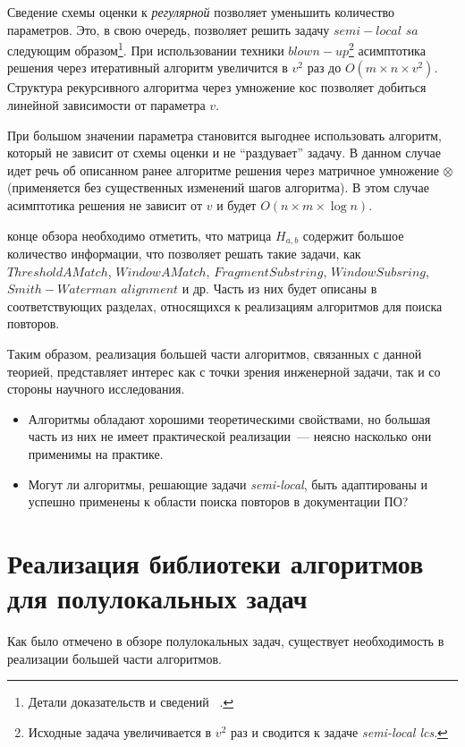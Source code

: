 Сведение схемы оценки к \emph{регулярной} позволяет уменьшить количество параметров.
Это, в свою очередь, позволяет решить задачу $semi-local$ $sa$ следующим образом\footnote{Детали доказательств и сведений ~\cite{tiskin2006all}.}. 
При использовании техники $blown-up$\footnote{Исходные задача увеличивается в $v^2$ раз и сводится к задаче \emph{semi-local lcs}.} асимптотика решения через  итеративный алгоритм увеличится в $v^2$ раз до $O(m \times n \times v^2)$.
Структура рекурсивного алгоритма через умножение кос позволяет добиться линейной зависимости от параметра $v$. 

При большом значении параметра становится выгоднее использовать алгоритм, который не зависит от схемы оценки и не ``раздувает'' задачу. 
В данном случае идет речь об описанном ранее алгоритме решения через матричное умножение $\otimes$ (применяется без существенных изменений шагов алгоритма). 
В этом случае асимптотика решения не зависит от $v$ и будет $O(  n \times m \times \log n)$.

\vspace{4 mm}
 конце обзора необходимо отметить, что матрица $H_{a,b}$ содержит большое количество информации, что позволяет решать такие задачи, как $ThresholdAMatch$, $WindowAMatch$, $FragmentSubstring$, $WindowSubsring$, $Smith-Waterman$  $alignment$ и др.
Часть из них будет описаны в соответствующих разделах, относящихся к реализациям алгоритмов для поиска повторов.

Таким образом, реализация большей части алгоритмов, связанных с данной теорией, представляет интерес как с точки зрения инженерной задачи, так и со стороны научного исследования.
\begin{itemize}
    \item Алгоритмы обладают хорошими  теоретическими свойствами, но большая часть из них не имеет практической реализации~--- неясно насколько они применимы на практике.
    \item Могут ли алгоритмы, решающие задачи \emph{semi-local}, быть адаптированы и успешно применены к области поиска повторов в документации ПО?
\end{itemize}



\section{Реализация библиотеки алгоритмов для полулокальных задач}\label{librarySection}
Как было отмечено в обзоре полулокальных задач,
существует необходимость в реализации большей части алгоритмов.

